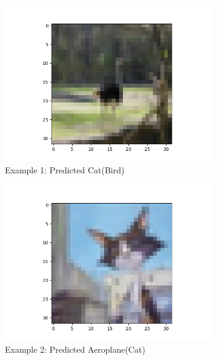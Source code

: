 \documentclass[11pt]{article}
\begin{document}
\begin{figure}[H]
    \begin{subfigure}[b]{0.3\textwidth}
        \centering
        \includegraphics[width=\linewidth]{misB1.png}
        \caption{Example 1: Predicted Cat(Bird)}
    \end{subfigure} 
    \begin{subfigure}[b]{0.3\textwidth}
        \centering
        \includegraphics[width=\linewidth]{misB2.png}
        \caption{Example 2: Predicted Aeroplane(Cat)}
    \end{subfigure} 
    \begin{subfigure}[b]{0.3\textwidth}
        \centering

\end{subfigure}
\end{figure}
\end{document}
